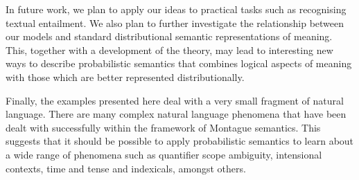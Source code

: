 \documentclass[11pt]{article}
\theoremstyle{definition}
\begin{document}

In future work, we plan to apply our ideas to practical tasks such as
recognising textual entailment.
We also plan to further investigate the relationship between our models and
standard distributional semantic representations of meaning. This,
together with a development of the theory, may lead to interesting
new ways to describe probabilistic semantics that combines logical
aspects of meaning with those which are better represented
distributionally.

Finally, the examples presented here deal with a very small fragment
of natural language. There are many complex natural language phenomena
that have been dealt with successfully within the framework of
Montague semantics. This suggests that it should be possible to apply
probabilistic semantics to learn about a wide range of phenomena such
as quantifier scope ambiguity, intensional contexts, time and tense
and indexicals, amongst others.





\end{document}
